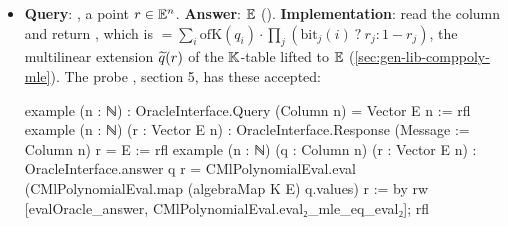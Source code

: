 \begin{itemize}
\item \textbf{Query}: , a point $r \in \mathbb{E}^n$. \textbf{Answer}: $\mathbb{E}$
  (). \textbf{Implementation}: read the column and return
  \allowbreak{}, which is
  $= \sum_i \mathrm{ofK}(q_i) \cdot \prod_j (\mathrm{bit}_j(i)\ ?\ r_j : 1 - r_j)$, the
  multilinear extension $\widetilde{q}(r)$ of the $\mathbb{K}$-table lifted to $\mathbb{E}$
  (\cref{sec:gen-lib-comppoly-mle}). The probe , section 5, has these accepted:

\begin{leancode}
example (n : ℕ) : OracleInterface.Query (Column n) = Vector E n := rfl
example (n : ℕ) (r : Vector E n) : OracleInterface.Response (Message := Column n) r = E := rfl
example (n : ℕ) (q : Column n) (r : Vector E n) :
    OracleInterface.answer q r =
      CMlPolynomialEval.eval (CMlPolynomialEval.map (algebraMap K E) q.values) r := by
  rw [evalOracle_answer, CMlPolynomialEval.eval₂_mle_eq_eval₂]; rfl
\end{leancode}


\end{itemize}
